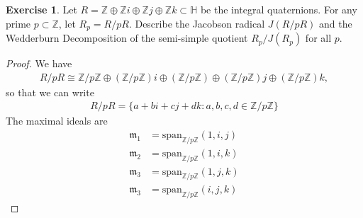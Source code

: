 \documentclass[12pt]{extarticle}
\newcommand{\set}[1]{\{#1\}}
\newcommand{\Z}{\mathbb{Z}}
\newcommand{\<}{\langle}
\renewcommand{\>}{\rangle}
\theoremstyle{definition}
\newtheorem{exercise}{Exercise}
\begin{document}
\begin{exercise}
  Let $R = \Z \oplus \Z i \oplus \Z j \oplus \Z k \subset \mathbb{H}$ be the integral quaternions. For any prime $p \subset \Z$, let $R_p = R / pR$.
  Describe the Jacobson radical $J(R/pR)$ and the Wedderburn Decomposition of the semi-simple quotient $R_p/J(R_p)$ for all $p$. 
\end{exercise}
\begin{proof}
  We have
  \begin{align*}
    R/pR \cong \Z/p\Z \oplus (\Z/p\Z)i \oplus (\Z/p\Z) \oplus (\Z/p\Z)j \oplus (\Z/p\Z) k, 
  \end{align*}
  so that we can write
  \begin{align*}
    R/pR = \set{a+bi+cj+dk : a,b,c,d \in \Z/p\Z}
  \end{align*}
  The maximal ideals are
  \begin{align*}
    \mathfrak{m }_1 &= \text{span}_{\Z/p\Z}(1,i,j) \\
    \mathfrak{m}_2 &= \text{span}_{\Z/p\Z}(1,i,k) \\
    \mathfrak{m}_3 &= \text{span}_{\Z/p\Z}(1,j,k) \\
    \mathfrak{m}_3 &= \text{span}_{\Z/p\Z}(i,j,k) 
  \end{align*}
\end{proof}
\end{document}
